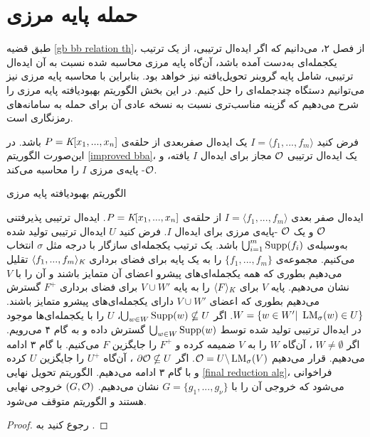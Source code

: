 \section{حمله‌ پایه‌ مرزی}
طبق قضیه‌ 
\ref{gb bb relation th}،
از فصل ۲، می‌دانیم که اگر ایده‌ال ترتیبی، از یک ترتیب یکجمله‌ای به‌دست آمده باشد، آن‌گاه پایه‌  مرزی محاسبه شده نسبت به آن ایده‌ال ترتیبی، شامل پایه‌  گروبنر تحویل‌یافته نیز خواهد بود. بنابراین با محاسبه‌  پایه‌  مرزی نیز می‌توانیم دستگاه چندجمله‌ای را حل کنیم.  در این بخش الگوریتم بهبود‌یافته‌  پایه‌  مرزی را شرح می‌دهیم که گزینه‌  مناسب‌تری نسبت به نسخه‌  عادی آن برای حمله به سامانه‌های رمزنگاری است. 
\begin{theorem}
فرض کنید 
$I = \langle f_{1},...,f_{m} \rangle$
یک ایده‌ال صفربعدی از حلقه‌ی 
$P = \textit{K}[x_{1},...,x_{n}]$
باشد. در این‌صورت الگوریتم 
\ref{improved bba}، 
یک ایده‌ال ترتیبی 
${\mathcal O}$
مجاز برای ایده‌ال 
$I$
یافته،  و 
${\mathcal O}$-
پایه‌ی مرزی 
$I$
را محاسبه می‌کند.
\renewcommand{\algorithmicrequire}{\textbf{ورودی}}
\renewcommand{\algorithmicensure}{\textbf{خروجی}}
\begin{algorithm}[]
	\caption{الگوریتم بهبود‌یافته‌  پایه‌  مرزی}
	\label{improved bba}
	\begin{algorithmic}[1]				
		\REQUIRE ‌ایده‌ال صفر بعدی 
		$I = \langle f_{1},...,f_{m} \rangle$
		از حلقه‌ی 
		$P = \textit{K}[x_{1},...,x_{n}]$.
		\ENSURE ایده‌ال ترتیبی پذیرفتنی 
		${\mathcal O}$
		و یک 
		${\mathcal O}$
		-پایه‌ی مرزی برای ایده‌ال 
		$I$.
		\STATE 
		فرض کنید 
		$U$
		ایده‌ال ترتیبی تولید شده به‌وسیله‌ی 
		$\bigcup_{i = 1}^{m}\operatorname{\mathrm{Supp}}(f_{i})$
		باشد. یک ترتیب یکجمله‌ای سازگار با درجه مثل 
		$\sigma$
		انتخاب می‌کنیم.
		\STATE مجموعه‌ی 
		$\{f_{1},...,f_{m}\}$
		را به یک پایه برای فضای برداری 
		$\langle f_{1},...,f_{m}\rangle_{\textit{K}}$
		تقلیل می‌دهیم بطوری که همه‌  یکجمله‌ای‌های پیشرو اعضای آن متمایز باشند و آن را با 
		$V$
		نشان می‌دهیم.
		\STATE  پایه‌ 
		$V$
		برای 
		$\langle F \rangle_{\textit{K}}$
		را به پایه‌ 
		$V\cup W'$
		برای فضای برداری 
		$F^{+}$
		گسترش می‌دهیم بطوری که اعضای 
	$V\cup W'$
	دارای یکجمله‌ای‌های پیشرو متمایز باشند. 
	\STATE $W = \{w\in W'| \ \operatorname{\mathrm{LM}}_{\sigma}(w)\in U\}$.
	\STATE اگر 
	$\bigcup_{w\in W}\operatorname{\mathrm{Supp}}(w)\nsubseteq U$، 
$U$
را با یکجمله‌ای‌ها موجود در ایده‌ال ترتیبی تولید شده توسط 
$\bigcup_{w\in W}\operatorname{\mathrm{Supp}}(w)$
گسترش داده و به گام ۴ می‌رویم.
\STATE اگر 
$W\neq \emptyset$
، آن‌گاه 
$W$
را به 
$V$
ضمیمه کرده و 
$F^{+}$
را جایگزین 
$F$
می‌کنیم. با گام ۳ ادامه می‌دهیم. 
\STATE قرار می‌دهیم 
${\mathcal O} = U\backslash \operatorname{\mathrm{LM}}_{\sigma}(V)$.
اگر 
$\partial\mathcal{O}\nsubseteq U$
، آن‌گاه 
$U^{+}$
را جایگزین 
$U$
کرده و با گام ۳ ادامه می‌دهیم. 
\STATE الگوریتم تحویل نهایی 
\ref{final reduction alg}، 
فراخوانی می‌شود که خروجی آن را با 
$G = \{g_{1},...,g_{\nu}\}$
نشان می‌دهیم. 
$(G, {\mathcal O})$
خروجی نهایی هستند و الگوریتم متوقف می‌شود. 
	\end{algorithmic}
\end{algorithm}
\end{theorem}
\begin{proof}
رجوع کنید به 
{\small \cite{cca2_kreuzer}.}
\end{proof}

